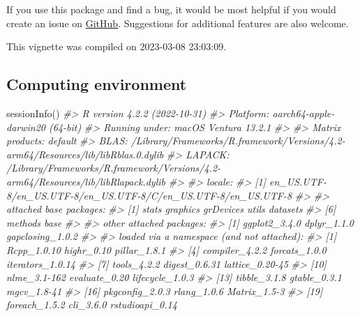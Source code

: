 \documentclass[
]{article}
\newenvironment{Shaded}{\begin{snugshade}}{\end{snugshade}}
\newcommand{\CommentTok}[1]{\textcolor[rgb]{0.56,0.35,0.01}{\textit{#1}}}
\newcommand{\FunctionTok}[1]{\textcolor[rgb]{0.00,0.00,0.00}{#1}}
\newcommand{\NormalTok}[1]{#1}
\begin{document}
If you use this package and find a bug, it would be most helpful if you would create an issue on \href{https://github.com/ilundberg/gapclosing}{GitHub}. Suggestions for additional features are also welcome.

This vignette was compiled on 2023-03-08 23:03:09.

\hypertarget{computing-environment}{%
\subsection{Computing environment}\label{computing-environment}}

\begin{Shaded}
\begin{Highlighting}[]
\FunctionTok{sessionInfo}\NormalTok{()}
\CommentTok{\#\textgreater{} R version 4.2.2 (2022{-}10{-}31)}
\CommentTok{\#\textgreater{} Platform: aarch64{-}apple{-}darwin20 (64{-}bit)}
\CommentTok{\#\textgreater{} Running under: macOS Ventura 13.2.1}
\CommentTok{\#\textgreater{} }
\CommentTok{\#\textgreater{} Matrix products: default}
\CommentTok{\#\textgreater{} BLAS:   /Library/Frameworks/R.framework/Versions/4.2{-}arm64/Resources/lib/libRblas.0.dylib}
\CommentTok{\#\textgreater{} LAPACK: /Library/Frameworks/R.framework/Versions/4.2{-}arm64/Resources/lib/libRlapack.dylib}
\CommentTok{\#\textgreater{} }
\CommentTok{\#\textgreater{} locale:}
\CommentTok{\#\textgreater{} [1] en\_US.UTF{-}8/en\_US.UTF{-}8/en\_US.UTF{-}8/C/en\_US.UTF{-}8/en\_US.UTF{-}8}
\CommentTok{\#\textgreater{} }
\CommentTok{\#\textgreater{} attached base packages:}
\CommentTok{\#\textgreater{} [1] stats     graphics  grDevices utils     datasets }
\CommentTok{\#\textgreater{} [6] methods   base     }
\CommentTok{\#\textgreater{} }
\CommentTok{\#\textgreater{} other attached packages:}
\CommentTok{\#\textgreater{} [1] ggplot2\_3.4.0    dplyr\_1.1.0      gapclosing\_1.0.2}
\CommentTok{\#\textgreater{} }
\CommentTok{\#\textgreater{} loaded via a namespace (and not attached):}
\CommentTok{\#\textgreater{}  [1] Rcpp\_1.0.10       highr\_0.10        pillar\_1.8.1     }
\CommentTok{\#\textgreater{}  [4] compiler\_4.2.2    forcats\_1.0.0     iterators\_1.0.14 }
\CommentTok{\#\textgreater{}  [7] tools\_4.2.2       digest\_0.6.31     lattice\_0.20{-}45  }
\CommentTok{\#\textgreater{} [10] nlme\_3.1{-}162      evaluate\_0.20     lifecycle\_1.0.3  }
\CommentTok{\#\textgreater{} [13] tibble\_3.1.8      gtable\_0.3.1      mgcv\_1.8{-}41      }
\CommentTok{\#\textgreater{} [16] pkgconfig\_2.0.3   rlang\_1.0.6       Matrix\_1.5{-}3     }
\CommentTok{\#\textgreater{} [19] foreach\_1.5.2     cli\_3.6.0         rstudioapi\_0.14  }

\end{Highlighting}
\end{Shaded}
\end{document}
